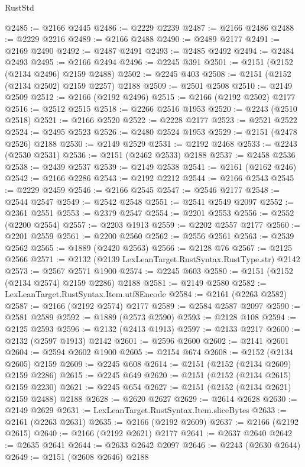 \begin{lexlean}{RustStd}
\begin{coremodule}
@2485 := @2166 @2445
@2486 := @2229 @2239
@2487 := @2166 @2486
@2488 := @2229 @2216
@2489 := @2166 @2488
@2490 := @2489 @2177
@2491 := @2169 @2490
@2492 := @2487 @2491
@2493 := @2485 @2492
@2494 := @2484 @2493
@2495 := @2166 @2494
@2496 := @2245 @391
@2501 := @2151 (@2152 (@2134 @2496) @2159 @2488)
@2502 := @2245 @403
@2508 := @2151 (@2152 (@2134 @2502) @2159 @2257) @2188
@2509 := @2501 @2508
@2510 := @2149 @2509
@2512 := @2166 (@2192 @2496)
@2515 := @2166 (@2192 @2502) @2177
@2516 := @2512 @2515
@2518 := @2266 @2516 @1953
@2520 := @2243 (@2510 @2518)
@2521 := @2166 @2520
@2522 := @2228 @2177
@2523 := @2521 @2522
@2524 := @2495 @2523
@2526 := @2480 @2524 @1953
@2529 := @2151 (@2478 @2526) @2188
@2530 := @2149 @2529
@2531 := @2192 @2468
@2533 := @2243 (@2530 @2531)
@2536 := @2151 (@2462 @2533) @2188
@2537 := @2458 @2536
@2538 := @2439 @2537
@2539 := @2149 @2538
@2541 := @2161 (@2162 @246)
@2542 := @2166 @2286
@2543 := @2192 @2212
@2544 := @2166 @2543
@2545 := @2229 @2459
@2546 := @2166 @2545
@2547 := @2546 @2177
@2548 := @2544 @2547
@2549 := @2542 @2548
@2551 := @2541 @2549 @2097
@2552 := @2361 @2551
@2553 := @2379 @2547
@2554 := @2201 @2553
@2556 := @2552 (@2200 @2554)
@2557 := @2203 @1913
@2559 := @2202 @2557 @2177
@2560 := @2201 @2559
@2561 := @2200 @2560
@2562 := @2556 @2561
@2563 := @2539 @2562
@2565 := @1889 (@2420 @2563)
@2566 := @2128 @76
@2567 := @2125 @2566
@2571 := @2132 (@2139 LexLeanTarget.RustSyntax.RustType.str) @2142
@2573 := @2567 @2571 @1900
@2574 := @2245 @603
@2580 := @2151 (@2152 (@2134 @2574) @2159 @2286) @2188
@2581 := @2149 @2580
@2582 := LexLeanTarget.RustSyntax.Item.utf8Encode
@2584 := @2161 (@2263 @2582)
@2587 := @2166 (@2192 @2574) @2177
@2589 := @2584 @2587 @2097
@2590 := @2581 @2589
@2592 := @1889 (@2573 @2590)
@2593 := @2128 @108
@2594 := @2125 @2593
@2596 := @2132 (@2413 @1913)
@2597 := @2133 @2217
@2600 := @2132 (@2597 @1913) @2142
@2601 := @2596 @2600
@2602 := @2141 @2601
@2604 := @2594 @2602 @1900
@2605 := @2154 @674
@2608 := @2152 (@2134 @2605) @2159
@2609 := @2245 @608
@2614 := @2151 (@2152 (@2134 @2609) @2159 @2286)
@2615 := @2245 @649
@2620 := @2151 (@2152 (@2134 @2615) @2159 @2230)
@2621 := @2245 @654
@2627 := @2151 (@2152 (@2134 @2621) @2159 @2488) @2188
@2628 := @2620 @2627
@2629 := @2614 @2628
@2630 := @2149 @2629
@2631 := LexLeanTarget.RustSyntax.Item.sliceBytes
@2633 := @2161 (@2263 @2631)
@2635 := @2166 (@2192 @2609)
@2637 := @2166 (@2192 @2615)
@2640 := @2166 (@2192 @2621) @2177
@2641 := @2637 @2640
@2642 := @2635 @2641
@2644 := @2633 @2642 @2097
@2646 := @2243 (@2630 @2644)
@2649 := @2151 (@2608 @2646) @2188

\end{coremodule}
\end{lexlean}
